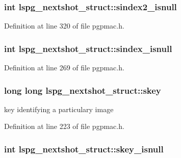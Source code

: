 \hypertarget{structlspg__nextshot__struct_a28e0b5c32a2741ef22edeb9d35b04e4d}{
\subsubsection[{sindex2\-\_\-isnull}]{\setlength{\rightskip}{0pt plus 5cm}int lspg\-\_\-nextshot\-\_\-struct\-::sindex2\-\_\-isnull}}\label{structlspg__nextshot__struct_a28e0b5c32a2741ef22edeb9d35b04e4d}


Definition at line 320 of file pgpmac.\-h.

\hypertarget{structlspg__nextshot__struct_a7ca4fbc86974d1b75a681ba5ecaaf5af}{
\subsubsection[{sindex\-\_\-isnull}]{\setlength{\rightskip}{0pt plus 5cm}int lspg\-\_\-nextshot\-\_\-struct\-::sindex\-\_\-isnull}}\label{structlspg__nextshot__struct_a7ca4fbc86974d1b75a681ba5ecaaf5af}


Definition at line 269 of file pgpmac.\-h.

\hypertarget{structlspg__nextshot__struct_af64a4e3f17752b5f1f05fb15d6f48382}{
\subsubsection[{skey}]{\setlength{\rightskip}{0pt plus 5cm}long long lspg\-\_\-nextshot\-\_\-struct\-::skey}}\label{structlspg__nextshot__struct_af64a4e3f17752b5f1f05fb15d6f48382}


key identifying a particulary image 



Definition at line 223 of file pgpmac.\-h.

\hypertarget{structlspg__nextshot__struct_abd3c69357470052eb79ddd8eddd57b2c}{
\subsubsection[{skey\-\_\-isnull}]{\setlength{\rightskip}{0pt plus 5cm}int lspg\-\_\-nextshot\-\_\-struct\-::skey\-\_\-isnull}}\label{structlspg__nextshot__struct_abd3c69357470052eb79ddd8eddd57b2c}


